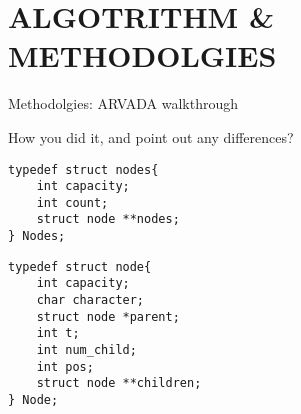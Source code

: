 \chapter{ALGOTRITHM \& METHODOLGIES}

Methodolgies:
ARVADA walkthrough

How you did it, and point out any differences?

\begin{lstlisting}[caption={Struct used in code to store all \textit{trees}}]
typedef struct nodes{
    int capacity;
    int count;
    struct node **nodes;
} Nodes;
\end{lstlisting}

\begin{lstlisting}[caption={Struct used in \textit{trees}}]
typedef struct node{
    int capacity;
    char character;
    struct node *parent;
    int t;
    int num_child;
    int pos;
    struct node **children;
} Node;
\end{lstlisting}